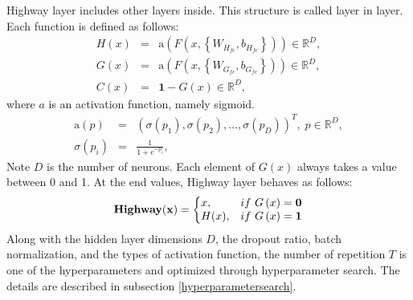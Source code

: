 \documentclass[useamsfonts]{pasj01}
\begin{document}
Highway layer includes other layers inside.  This structure is called layer in layer.  Each function is defined as follows: 
\begin{eqnarray}
    H \left(x\right) &=& \mathrm{a} \left( F \left(x, \left\{W_{H_{fc}}, b_{H_{fc}}\right\}\right) \right) \in \mathbb{R}^D, \\
    G \left(x\right) &=& \mathrm{a} \left( F \left(x, \left\{W_{G_{fc}}, b_{G_{fc}}\right\}\right) \right) \in \mathbb{R}^D, \\
    C \left(x\right) &=& \mathbf{1} - G \left(x\right) \in \mathbb{R}^D,
\end{eqnarray}
where $a$ is an activation function, namely sigmoid.
\begin{eqnarray*}
    \mathrm{a} \left(p\right) &=& \left( \sigma\left(p_1\right),\sigma\left(p_2\right), \ldots, \sigma\left(p_D\right) \right)^T, \; p \in \mathbb{R}^D, \\
    \sigma \left(p_i\right) &=& \frac{1}{1 + e^{-p_i}},
\end{eqnarray*}
Note $D$ is the number of neurons.  Each element of $G(x)$ always takes a value between 0 and 1.  At the end values, Highway layer behaves as follows:
\begin{equation}
    {\bf Highway(x)}=\left\{
    \begin{array}{@{}ll@{}}
      x, & \mathrm{if} \ G \left(x\right)= \mathbf{0} \\
      H(x), & \mathrm{if} \ G \left(x\right)= \mathbf{1} 
    \end{array}\right.
\end{equation}
Along with the hidden layer dimensions $D$, the dropout ratio, batch normalization, and the types of activation function, the number of repetition $T$ is one of the hyperparameters and optimized through hyperparameter search. The details are described in subsection \ref{hyperparametersearch}.
\end{document}

